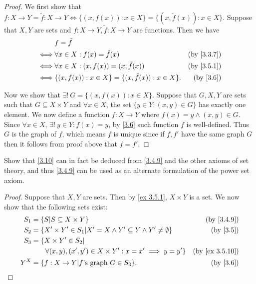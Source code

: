 \begin{proof}
  We first show that \(f : X \to Y = \tilde{f} : X \to Y \iff \{(x, f(x)) : x \in X\} = \{(x, \tilde{f}(x)) : x \in X\}\).
  Suppose that \(X, Y\) are sets and \(f : X \to Y, \tilde{f} : X \to Y\) are functions.
  Then we have
  \begin{align*}
         & f = \tilde{f}                                                                         \\
    \iff & \forall x \in X : f(x) = \tilde{f}(x)                      & \text{(by \cref{3.3.7})} \\
    \iff & \forall x \in X : (x, f(x)) = (x, \tilde{f}(x))            & \text{(by \cref{3.5.1})} \\
    \iff & \{(x, f(x)) : x \in X\} = \{(x, \tilde{f}(x)) : x \in X\}. & \text{(by \cref{3.6})}
  \end{align*}

  Now we show that \(\exists!\ G = \{(x, f(x)) : x \in X\}\).
  Suppose that \(G, X, Y\) are sets such that \(G \subseteq X \times Y\) and \(\forall x \in X\), the set \(\{y \in Y : (x, y) \in G\}\) has exactly one element.
  We now define a function \(f : X \to Y\) where \(f(x) = y \land (x, y) \in G\).
  Since \(\forall x \in X\), \(\exists!\ y \in Y : f(x) = y\), by \cref{3.6} such function \(f\) is well-defined.
  Thus \(G\) is the graph of \(f\), which means \(f\) is unique since if \(f, f'\) have the same graph \(G\) then it follows from proof above that \(f = f'\).
\end{proof}

\begin{exercise}\label{ex 3.5.11}
  Show that \cref{3.10} can in fact be deduced from \cref{3.4.9} and the other axioms of set theory, and thus \cref{3.4.9} can be used as an alternate formulation of the power set axiom.
\end{exercise}

\begin{proof}
  Suppose that \(X, Y\) are sets.
  Then by \cref{ex 3.5.1}, \(X \times Y\) is a set.
  We now show that the following sets exist:
  \begin{align*}
    S_1 & = \{S | S \subseteq X \times Y\}                                                 & \text{(by \cref{3.4.9})}     \\
    S_2 & = \{X' \times Y' \in S_1 | X' = X \land Y' \subseteq Y \land Y' \neq \emptyset\} & \text{(by \cref{3.5})}       \\
    S_3 & = \{X \times Y' \in S_2 |                                                                                       \\
        & \quad\quad \forall (x, y), (x', y') \in X \times Y' : x = x' \implies y = y'\}   & \text{(by \cref{ex 3.5.10})} \\
    Y^X & = \{f : X \to Y | f \text{'s graph } G \in S_3\}.                                & \text{(by \cref{3.6})}
  \end{align*}
\end{proof}

